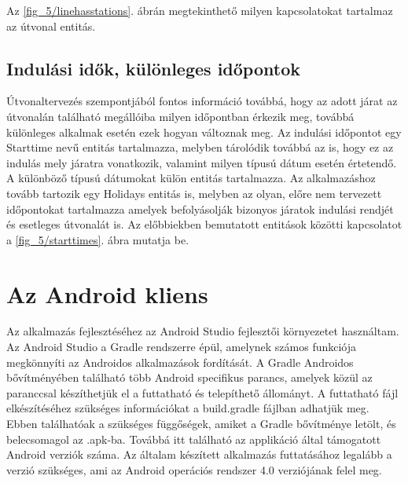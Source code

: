 Az \ref{fig_5/linehasstations}. ábrán megtekinthető milyen kapcsolatokat tartalmaz az útvonal entitás. 


\subsection*{Indulási idők, különleges időpontok}
\label{starttimes}

Útvonaltervezés szempontjából fontos információ továbbá, hogy az adott járat az útvonalán található megállóiba milyen időpontban érkezik meg, továbbá különleges alkalmak esetén ezek hogyan változnak meg. 
Az indulási időpontot egy Starttime nevű entitás tartalmazza, melyben tárolódik továbbá az is, hogy ez az indulás mely járatra vonatkozik, valamint milyen típusú dátum esetén értetendő. 
A különböző típusú dátumokat külön entitás tartalmazza. 
Az alkalmazáshoz tovább tartozik egy Holidays entitás is, melyben az olyan, előre nem tervezett időpontokat tartalmazza amelyek befolyásolják bizonyos járatok indulási rendjét és esetleges útvonalát is. 
Az előbbiekben bemutatott entitások közötti kapcsolatot a \ref{fig_5/starttimes}. ábra mutatja be. 



\section{Az Android kliens}
\label{androidclient}
Az alkalmazás fejlesztéséhez az Android Studio fejlesztői környezetet használtam.
Az Android Studio a Gradle rendszerre épül, amelynek számos funkciója megkönnyíti az Androidos alkalmazások fordítását.
A Gradle Androidos bővítményében található több Android specifikus parancs, amelyek közül az  paranccsal készíthetjük el a futtatható és telepíthető állományt.
A futtatható fájl elkészítéséhez szükséges információkat a build.gradle fájlban adhatjük meg.
Ebben találhatóak a szükséges függőségek, amiket a Gradle bővítménye letölt, és belecsomagol az .apk-ba.
Továbbá itt található az applikáció által támogatott Android verziók száma.
Az általam készített alkalmazás futtatásához legalább a  verzió szükséges, ami az Android operációs rendszer 4.0 verziójának felel meg.

